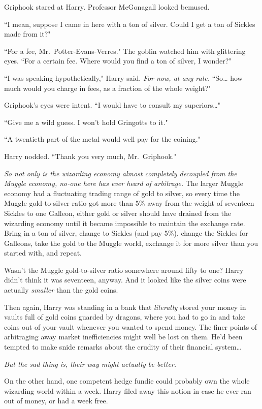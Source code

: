Griphook stared at Harry. Professor McGonagall looked bemused.

``I mean, suppose I came in here with a ton of silver. Could I get a ton of Sickles made from it?"

``For a fee, Mr.~Potter-Evans-Verres." The goblin watched him with glittering eyes. ``For a certain fee. Where would you find a ton of silver, I wonder?"

``I was speaking hypothetically," Harry said. \emph{For now, at any rate.} ``So{\ldots} how much would you charge in fees, as a fraction of the whole weight?"

Griphook's eyes were intent. ``I would have to consult my superiors{\ldots}"

``Give me a wild guess. I won't hold Gringotts to it."

``A twentieth part of the metal would well pay for the coining."

Harry nodded. ``Thank you very much, Mr.~Griphook."

\emph{So not only is the wizarding economy almost completely decoupled from the Muggle economy, no-one here has ever heard of arbitrage.} The larger Muggle economy had a fluctuating trading range of gold to silver, so every time the Muggle gold-to-silver ratio got more than 5\% away from the weight of seventeen Sickles to one Galleon, either gold or silver should have drained from the wizarding economy until it became impossible to maintain the exchange rate. Bring in a ton of silver, change to Sickles (and pay 5\%), change the Sickles for Galleons, take the gold to the Muggle world, exchange it for more silver than you started with, and repeat.

Wasn't the Muggle gold-to-silver ratio somewhere around fifty to one? Harry didn't think it was seventeen, anyway. And it looked like the silver coins were actually \emph{smaller} than the gold coins.

Then again, Harry was standing in a bank that \emph{literally} stored your money in vaults full of gold coins guarded by dragons, where you had to go in and take coins out of your vault whenever you wanted to spend money. The finer points of arbitraging away market inefficiencies might well be lost on them. He'd been tempted to make snide remarks about the crudity of their financial system{\ldots}

\emph{But the sad thing is, their way might actually be better.}

On the other hand, one competent hedge fundie could probably own the whole wizarding world within a week. Harry filed away this notion in case he ever ran out of money, or had a week free.

